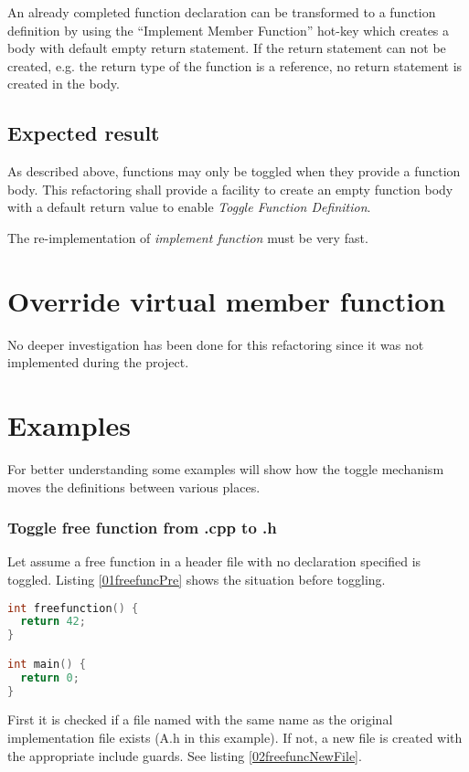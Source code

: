 An already completed function declaration can be transformed to a function
definition by using the ``Implement Member Function'' hot-key which creates a
body with default empty return statement.
If the return statement can not be created, e.g. the return type of the
function is a reference, no return statement is created in the body.

\subsection{Expected result}
As described above, functions may only be toggled when they provide a function 
body. This refactoring shall provide a facility to create an empty function body 
with a default return value to enable \textit{Toggle Function Definition}.

The re-implementation of \textit{implement function} must be very fast. 

\section{Override virtual member function}

No deeper investigation has been done for this refactoring since it was not 
implemented during the project.

\section{Examples}

For better understanding some examples will show how the toggle mechanism moves
the definitions between various places.

\subsubsection{Toggle free function from .cpp to .h}
Let assume a free function in a header file with no declaration specified is
toggled. Listing \nolinebreak\ref{01freefuncPre} shows the situation before
toggling. 

\begin{lstlisting}[caption={A.cpp},label={01freefuncPre},language=C++]
int freefunction() {
  return 42;
}

int main() {
  return 0;
}
\end{lstlisting}

First it is checked if a file named with the same name as the original
implementation file exists (A.h in this example). If not, a new file is created with the
appropriate include guards. See listing \nolinebreak\ref{02freefuncNewFile}.

